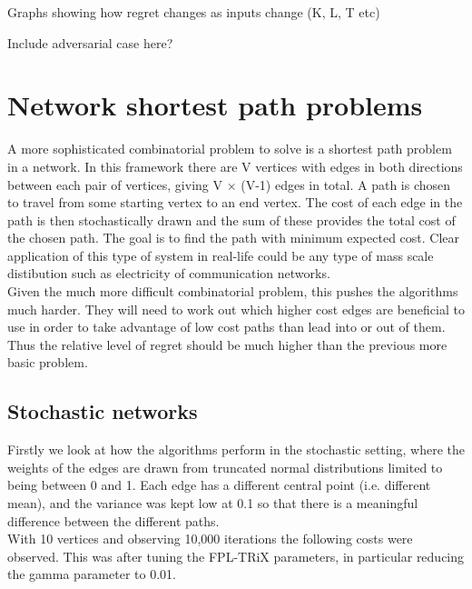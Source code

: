 Graphs showing how regret changes as inputs change (K, L, T etc)

Include adversarial case here?


\pagebreak


\section{Network shortest path problems}

A more sophisticated combinatorial problem to solve is a shortest path problem in a network. In this framework there are V vertices with edges in both directions between each pair of vertices, giving V $\times$ (V-1) edges in total. A path is chosen to travel from some starting vertex to an end vertex. The cost of each edge in the path is then stochastically drawn and the sum of these provides the total cost of the chosen path. The goal is to find the path with minimum expected cost. Clear application of this type of system in real-life could be any type of mass scale distibution such as electricity of communication networks.\\

Given the much more difficult combinatorial problem, this pushes the algorithms much harder. They will need to work out which higher cost edges are beneficial to use in order to take advantage of low cost paths than lead into or out of them. Thus the relative level of regret should be much higher than the previous more basic problem.\\

\subsection{Stochastic networks}

Firstly we look at how the algorithms perform in the stochastic setting, where the weights of the edges are drawn from truncated normal distributions limited to being between 0 and 1. Each edge has a different central point (i.e. different mean), and the variance was kept low at 0.1 so that there is a meaningful difference between the different paths.\\

With 10 vertices and observing 10,000 iterations the following costs were observed. This was after tuning the FPL-TRiX parameters, in particular reducing the gamma parameter to 0.01.\\

